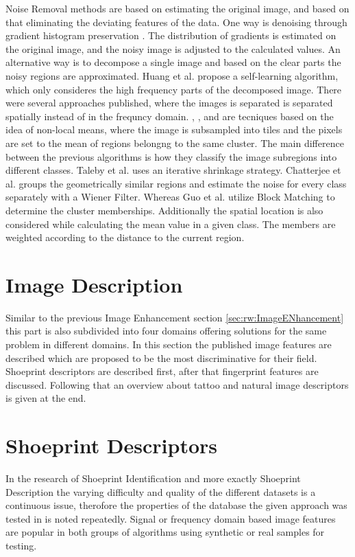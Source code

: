 \documentclass[draft,final]{vutinfth} %
\begin{document}
Noise Removal methods are based on estimating the original image, and based on that eliminating the deviating features of the data.
One way is denoising through gradient histogram preservation \cite{zuo2013texture}.
The distribution of gradients is estimated on the original image, and the noisy image is adjusted to the calculated values.
An alternative way is to decompose a single image and based on the clear parts the noisy regions are approximated.
Huang et al. \cite{huang2013self} propose a self-learning algorithm, which only consideres the high frequency parts of the decomposed image.
There were several approaches published, where the images is separated is separated spatially instead of in the frequncy domain.
\cite{xu2015patch}, \cite{talebi2013global}, \cite{chatterjee2011patch} and \cite{guo2015efficient} are tecniques based on the idea of non-local means, where the image is subsampled into tiles and the pixels are set to the mean of regions belongng to the same cluster.
The main difference between the previous algorithms is how they classify the image subregions into different classes.
Taleby et al. \cite{talebi2013global} uses an iterative shrinkage strategy. 
Chatterjee et al.  \cite{chatterjee2011patch} groups the geometrically similar regions and estimate the noise for every class separately with a Wiener Filter.
Whereas Guo et al. \cite{guo2015efficient} utilize Block Matching to determine the cluster memberships. 
Additionally the spatial location is also considered while calculating the mean value in a given class.
The members are weighted according to the distance to the current region.

\section{Image Description}

Similar to the previous Image Enhancement section \ref{sec:rw:ImageENhancement} this part is also subdivided into four domains offering solutions for the same problem in different domains.
In this section the published image features are described which are proposed to be the most discriminative for their field.
Shoeprint descriptors are described first, after that fingerprint features are discussed.
Following that an overview about tattoo and natural image descriptors is given at the end.

\section*{Shoeprint Descriptors}
\par
In the research of Shoeprint Identification and more exactly Shoeprint Description the varying difficulty and quality of the different datasets is a continuous issue, therofore the properties of the database the given approach was tested in is noted repeatedly.
Signal or frequency domain based image features are popular in both groups of algorithms using synthetic or real samples for testing.
\end{document}
